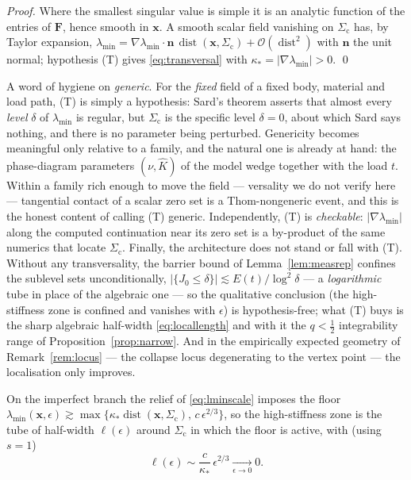 \begin{proof}
    Where the smallest singular value is simple it is an analytic function of the entries of $\bm{F}$, hence smooth in
    $\bm{x}$. A smooth scalar field vanishing on $\Sigma_{\mathrm{c}}$ has, by Taylor expansion, $\lambda_{\min}=\nabla\lambda_{\min}
        \cdot\bm{n}\,\operatorname{dist}(\bm{x},\Sigma_{\mathrm{c}})+\mathcal{O}(\operatorname{dist}^2)$ with $\bm{n}$ the unit normal;
    hypothesis (T) gives \eqref{eq:transversal} with $\kappa_*=|\nabla\lambda_{\min}|>0$. \qed
\end{proof}

\begin{remark}
    \label{rem:transgen}
    A word of hygiene on \emph{generic}. For the \emph{fixed} field of a fixed body, material and load path, (T) is
    simply a hypothesis: Sard's theorem asserts that almost every \emph{level} $\delta$ of $\lambda_{\min}$ is regular,
    but $\Sigma_{\mathrm{c}}$ is the specific level $\delta=0$, about which Sard says nothing, and there is no
    parameter being perturbed. Genericity becomes meaningful only relative to a family, and the natural one is already
    at hand: the phase-diagram parameters $(\nu,\hat K)$ of the model wedge together with the load $t$. Within a family
    rich enough to move the field --- versality we do not verify here --- tangential contact of a scalar zero set is a
    Thom-nongeneric event, and this is the honest content of calling (T) generic. Independently, (T) is
    \emph{checkable}: $|\nabla\lambda_{\min}|$ along the computed continuation near its zero set is a by-product of the
    same numerics that locate $\Sigma_{\mathrm{c}}$. Finally, the architecture does not stand or fall with (T). Without
    any transversality, the barrier bound of Lemma~\ref{lem:measrep} confines the sublevel sets unconditionally,
    $|\{J_0\le\delta\}|\lesssim E(t)/\log^2\delta$ --- a \emph{logarithmic} tube in place of the algebraic one --- so
    the qualitative conclusion (the high-stiffness zone is confined and vanishes with $\epsilon$) is hypothesis-free;
    what (T) buys is the sharp algebraic half-width \eqref{eq:locallength} and with it the $q<\tfrac12$ integrability
    range of Proposition~\ref{prop:narrow}. And in the empirically expected geometry of Remark~\ref{rem:locus} --- the
    collapse locus degenerating to the vertex point --- the localisation only improves.
\end{remark}

On the imperfect branch the relief of \eqref{eq:lminscale} imposes the floor $\lambda_{\min}(\bm{x},\epsilon)\gtrsim
    \max\{\kappa_*\operatorname{dist}(\bm{x},\Sigma_{\mathrm{c}}),\,c\,\epsilon^{2/3}\}$, so the high-stiffness zone is the tube of
half-width $\ell(\epsilon)$ around $\Sigma_{\mathrm{c}}$ in which the floor is active, with (using $s=1$)
\begin{equation}
    \label{eq:locallength}
    \ell(\epsilon) \sim \frac{c}{\kappa_*}\,\epsilon^{2/3} \xrightarrow[\epsilon\to0]{} 0 .
\end{equation}


